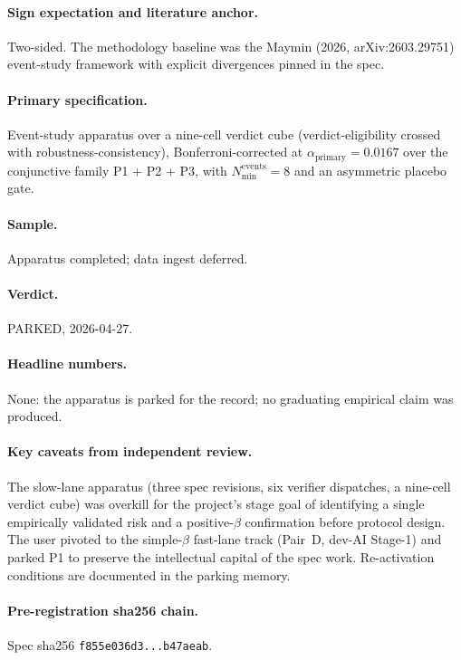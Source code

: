 \paragraph{Sign expectation and literature anchor.} Two-sided. The
methodology baseline was the Maymin (2026, arXiv:2603.29751)
event-study framework with explicit divergences pinned in the spec.

\paragraph{Primary specification.} Event-study apparatus over a
nine-cell verdict cube (verdict-eligibility crossed with
robustness-consistency), Bonferroni-corrected at
\(\alpha_{\mathrm{primary}} = 0.0167\) over the conjunctive family
P1 + P2 + P3, with \(N_{\min}^{\mathrm{events}} = 8\) and an
asymmetric placebo gate.

\paragraph{Sample.} Apparatus completed; data ingest deferred.

\paragraph{Verdict.} PARKED, 2026-04-27.

\paragraph{Headline numbers.} None: the apparatus is parked for the
record; no graduating empirical claim was produced.

\paragraph{Key caveats from independent review.} The slow-lane
apparatus (three spec revisions, six verifier dispatches, a nine-cell
verdict cube) was overkill for the project's stage goal of identifying
a single empirically validated risk and a positive-\(\beta\) confirmation
before protocol design. The user pivoted to the simple-\(\beta\)
fast-lane track (Pair~D, dev-AI Stage-1) and parked P1 to preserve the
intellectual capital of the spec work. Re-activation conditions are
documented in the parking memory.

\paragraph{Pre-registration sha256 chain.} Spec sha256
\texttt{f855e036d3...b47aeab}.

